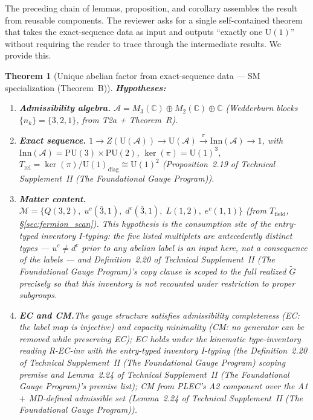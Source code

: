 \documentclass[11pt]{article}
\newtheorem{theorem}{Theorem}[section]
\theoremstyle{definition}
\newcommand{\U}{\mathrm{U}}
\newcommand{\TSII}{Technical Supplement~II (\emph{The Foundational Gauge Program})}
\begin{document}
The preceding chain of lemmas, proposition, and corollary assembles the
result from reusable components.  The reviewer asks for a single
self-contained theorem that takes the exact-sequence data as input and
outputs ``exactly one $\U(1)$'' without requiring the reader to trace
through the intermediate results.  We provide this.

\begin{theorem}[Unique abelian factor from exact-sequence data ---
SM specialization (Theorem~B)]%
\label{thm:unique_U1_consolidated}
\textbf{Hypotheses:}
\begin{enumerate}[label=(H\arabic*),nosep]
  \item \textbf{Admissibility algebra.}\quad
  $\mathcal{A} = M_3(\mathbb{C}) \oplus M_2(\mathbb{C}) \oplus
  \mathbb{C}$ (Wedderburn blocks $\{n_k\} = \{3, 2, 1\}$, from
  T2a + Theorem~R).
  \item \textbf{Exact sequence.}\quad
  $1 \to Z(\mathrm{U}(\mathcal{A})) \to \mathrm{U}(\mathcal{A})
  \xrightarrow{\pi} \mathrm{Inn}(\mathcal{A}) \to 1$, with
  $\mathrm{Inn}(\mathcal{A}) = \mathrm{PU}(3) \times \mathrm{PU}(2)$,
  $\ker(\pi) = \mathrm{U}(1)^3$,
  $T_{\mathrm{rel}} = \ker(\pi) / \mathrm{U}(1)_{\mathrm{diag}}
  \cong \mathrm{U}(1)^2$
  (Proposition~2.19 of \TSII{}).
  \item \textbf{Matter content.}\quad
  $\mathcal{M} = \{Q(3,2),\; u^c(\bar{3},1),\; d^c(\bar{3},1),\;
  L(1,2),\; e^c(1,1)\}$ (from $T_{\mathrm{field}}$,
  \S\ref{sec:fermion_scan}).  This hypothesis is the consumption site
  of the entry-typed inventory I-typing: the five listed multiplets
  are \emph{antecedently} distinct types --- $u^c \ne d^c$ prior to
  any abelian label is an input here, not a consequence of the labels
  --- and Definition~2.20 of \TSII{}'s copy clause is
  scoped to the full realized $\widetilde{G}$ precisely so that this
  inventory is not recounted under restriction to proper subgroups.
  \item \textbf{EC and CM.}\quad The gauge structure satisfies
  admissibility completeness (EC: the label map is injective) and
  capacity minimality (CM: no generator can be removed while
  preserving EC); EC holds under the kinematic type-inventory reading
  R-EC-inv with the entry-typed inventory I-typing (the
  Definition~2.20 of \TSII{} scoping premise and
  Lemma~2.24 of \TSII{}'s premise list); CM from PLEC's A2
  component over the A1 $+$ MD-defined admissible set
  (Lemma~2.24 of \TSII{}).
\end{enumerate}


\end{theorem}
\end{document}
